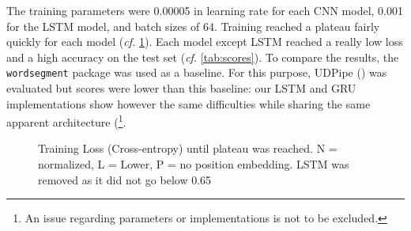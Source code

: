 \documentclass{jdmdh}
\begin{document}
The training parameters were 0.00005 in learning rate for each CNN model, 0.001 for the LSTM model, and batch sizes of 64. Training reached a plateau fairly quickly for each model (\textit{cf.} \ref{fig:loss}). Each model except LSTM reached a really low loss and a high accuracy on the test set (\textit{cf.} \ref{tab:scores}). To compare the results, the \texttt{wordsegment} package \citet{WordSegment} was used as a baseline. For this purpose, UDPipe (\citet{udpipe:2017}) was evaluated but scores were lower than this baseline: our LSTM and GRU implementations show however the same difficulties while sharing the same apparent architecture (\footnote{An issue regarding parameters or implementations is not to be excluded.}.

\begin{figure}[!ht]
  \begin{center}
    \caption{Training Loss (Cross-entropy) until plateau was reached. N = normalized, L = Lower, P = no position embedding. LSTM was removed as it did not go below 0.65}
  \label{fig:loss}
  \end{center}
\end{figure}
\end{document}
